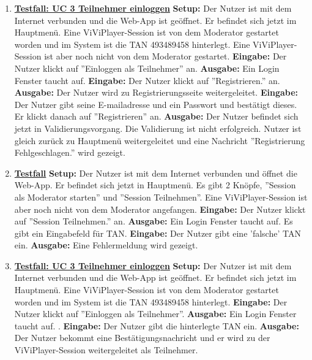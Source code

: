 \begin{enumerate}
	\item \underline{\textbf{Testfall: UC 3 Teilnehmer einloggen}} \linebreak
	\textbf{Setup:} Der Nutzer ist mit dem Internet verbunden und die Web-App ist geöffnet. Er befindet sich jetzt im Hauptmenü. Eine ViViPlayer-Session ist von dem Moderator gestartet worden und im System ist die TAN 493489458 hinterlegt.
	Eine ViViPlayer-Session ist aber noch nicht von dem Moderator gestartet. \linebreak
	\textbf{Eingabe:} Der Nutzer klickt auf ''Einloggen als Teilnehmer'' an. \linebreak
	\textbf{Ausgabe:} Ein Login Fenster taucht auf.\linebreak
	\textbf{Eingabe:} Der Nutzer klickt auf ''Registrieren.'' an.\linebreak
	\textbf{Ausgabe:} Der Nutzer wird zu Registrierungsseite weitergeleitet.\linebreak
	\textbf{Eingabe:} Der Nutzer gibt seine E-mailadresse und ein Passwort und bestätigt dieses. Er klickt danach auf ''Registrieren'' an. \linebreak
	\textbf{Ausgabe:} Der Nutzer befindet sich jetzt in Validierungsvorgang. Die Validierung ist nicht erfolgreich. Nutzer ist gleich zurück zu Hauptmenü weitergeleitet und eine Nachricht ''Registrierung Fehlgeschlagen.'' wird gezeigt.\linebreak
	
	\item \underline{\textbf{Testfall}} \linebreak
	\textbf{Setup:} Der Nutzer ist mit dem Internet verbunden und öffnet die Web-App. Er befindet sich jetzt in Hauptmenü. Es gibt 2 Knöpfe, ''Session als Moderator starten'' und ''Session Teilnehmen''.
	Eine ViViPlayer-Session ist aber noch nicht von dem Moderator angefangen. \linebreak
	\textbf{Eingabe:} Der Nutzer klickt auf ''Session Teilnehmen.'' an. \linebreak
	\textbf{Ausgabe:} Ein Login Fenster taucht auf. Es gibt ein Eingabefeld für TAN.\linebreak
	\textbf{Eingabe:} Der Nutzer gibt eine 'falsche' TAN ein. \linebreak
	\textbf{Ausgabe:} Eine Fehlermeldung wird gezeigt.
	
	\item \underline{\textbf{Testfall: UC 3 Teilnehmer einloggen}} \linebreak
	\textbf{Setup:} Der Nutzer ist mit dem Internet verbunden und die Web-App ist geöffnet. Er befindet sich jetzt im Hauptmenü. Eine ViViPlayer-Session ist von dem Moderator gestartet worden und im System ist die TAN 493489458 hinterlegt. \linebreak
	\textbf{Eingabe:} Der Nutzer klickt auf ''Einloggen als Teilnehmer''. \linebreak
	\textbf{Ausgabe:} Ein Login Fenster taucht auf. .\linebreak
	\textbf{Eingabe:} Der Nutzer gibt die hinterlegte TAN ein. \linebreak
	\textbf{Ausgabe:} Der Nutzer bekommt eine Bestätigungsnachricht und er wird zu der ViViPlayer-Session weitergeleitet als Teilnehmer.


\end{enumerate}
